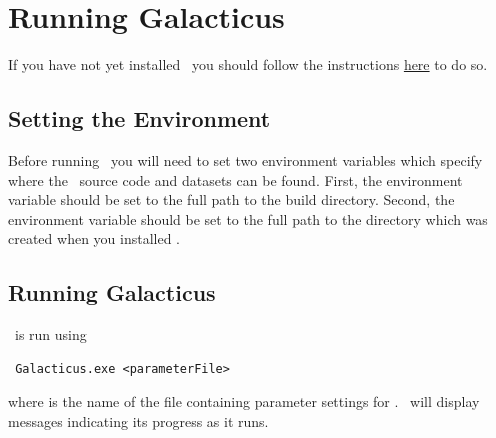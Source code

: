 \chapter{Running Galacticus}

If you have not yet installed \glc\ you should follow the instructions \href{https://github.com/galacticusorg/galacticus/wiki#how-do-i-install-and-use-galacticus}{here} to do so.

\section{Setting the Environment}

Before running \glc\ you will need to set two environment variables which specify where the \glc\ source code and datasets can be found. First, the environment variable  should be set to the full path to the build directory. Second, the environment variable  should be set to the full path to the  directory which was created when you installed \glc.

\section{Running Galacticus}

\glc\ is run using
\begin{verbatim}
 Galacticus.exe <parameterFile>
\end{verbatim}
where  is the name of the file containing parameter settings for \glc. \glc\ will display messages indicating its progress as it runs.

